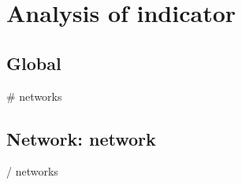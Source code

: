 \chapter{Analysis of {{indicator}} }

\section{Global}

{{# networks }}
\section{Network: {{network}} }

{{/ networks }}
